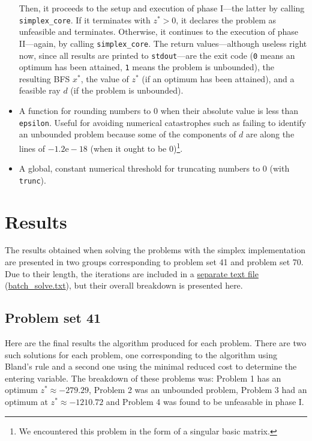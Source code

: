 \documentclass[a4paper]{article}
\begin{document}
\begin{itemize}
    Then, it proceeds to the setup and execution of phase I---the latter by calling \texttt{simplex_core}. If it terminates with $z^\ast > 0$, it declares the problem as unfeasible and terminates. Otherwise, it continues to the execution of phase II---again, by calling \texttt{simplex_core}. The return values---although useless right now, since all results are printed to \texttt{stdout}---are the exit code (\texttt{0} means an optimum has been attained, \texttt{1} means the problem is unbounded), the resulting BFS $x^\ast$, the value of $z^\ast$ (if an optimum has been attained), and a feasible ray $d$ (if the problem is unbounded).
    \item {}
    A function for rounding numbers to 0 when their absolute value is less than \texttt{epsilon}. Useful for avoiding numerical catastrophes such as failing to identify an unbounded problem because some of the components of $d$ are along the lines of $-1.2\mathrm{e}-\!18$ (when it ought to be 0)\footnote{We encountered this problem in the form of a singular basic matrix.}. 
    \item {} A global, constant numerical threshold for truncating numbers to 0 (with \texttt{trunc}).
\end{itemize}

\section{Results}

The results obtained when solving the problems with the simplex implementation are presented in two groups corresponding to problem set 41 and problem set 70.  Due to their length, the iterations are included in a \hyperref[file:batch_solve.txt]{separate text file} (\href{run:./batch_solve.txt}{batch\_solve.txt}), but their overall breakdown is presented here.

\subsection{Problem set 41}

Here are the final results the algorithm produced for each problem. There are two such solutions for each problem, one corresponding to the algorithm using Bland's rule and a second one using the minimal reduced cost to determine the entering variable. The breakdown of these problems was: Problem 1 has an optimum ${z}^{*} \approx -279.29$, Problem 2 was an unbounded problem, Problem 3 had an optimum at ${z}^{*} \approx -1210.72$ and Problem 4 was found to be unfeasable in phase I.
\end{document}
